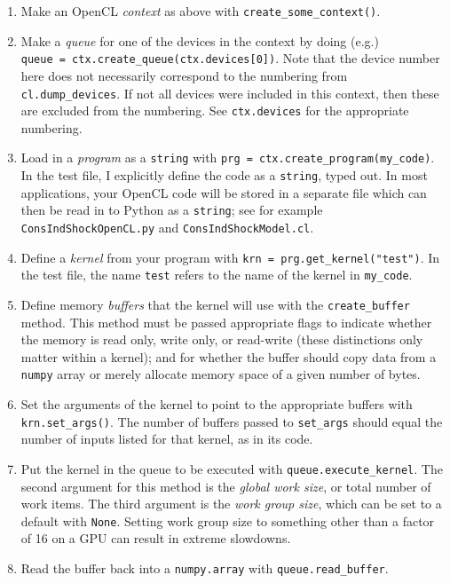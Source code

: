 \documentclass[12pt,pdftex,letterpaper]{article}
\begin{document}
\begin{enumerate}
\item Make an OpenCL \textit{context} as above with \texttt{create\_some\_context()}.

\item Make a \textit{queue} for one of the devices in the context by doing (e.g.)\\ \texttt{queue = ctx.create\_queue(ctx.devices[0])}.  Note that the device number here does not necessarily correspond to the numbering from \texttt{cl.dump\_devices}.  If not all devices were included in this context, then these are excluded from the numbering.  See \texttt{ctx.devices} for the appropriate numbering.

\item Load in a \textit{program} as a \texttt{string} with \texttt{prg = ctx.create\_program(my\_code)}.  In the test file, I explicitly define the code as a \texttt{string}, typed out.  In most applications, your OpenCL code will be stored in a separate file which can then be read in to Python as a \texttt{string}; see for example \texttt{ConsIndShockOpenCL.py} and \texttt{ConsIndShockModel.cl}.

\item Define a \textit{kernel} from your program with \texttt{krn = prg.get\_kernel("test")}.  In the test file, the name \texttt{test} refers to the name of the kernel in \texttt{my\_code}.

\item Define memory \textit{buffers} that the kernel will use with the \texttt{create\_buffer} method.  This method must be passed appropriate flags to indicate whether the memory is read only, write only, or read-write (these distinctions only matter within a kernel); and for whether the buffer should copy data from a \texttt{numpy} array or merely allocate memory space of a given number of bytes.

\item Set the arguments of the kernel to point to the appropriate buffers with \texttt{krn.set\_args()}.  The number of buffers passed to \texttt{set\_args} should equal the number of inputs listed for that kernel, as in its code.

\item Put the kernel in the queue to be executed with \texttt{queue.execute\_kernel}.  The second argument for this method is the \textit{global work size}, or total number of work items.  The third argument is the \textit{work group size}, which can be set to a default with \texttt{None}.  Setting work group size to something other than a factor of 16 on a GPU can result in extreme slowdowns.

\item Read the buffer back into a \texttt{numpy.array} with \texttt{queue.read\_buffer}.
\end{enumerate}
\end{document}

